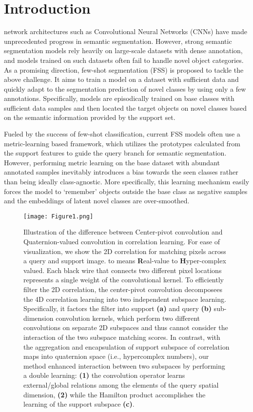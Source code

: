 \documentclass[lettersize,journal]{IEEEtran}
\begin{document}
\section{Introduction}\label{1.1}
 network architectures such as Convolutional Neural Networks (CNNs) have made unprecedented progress in semantic segmentation. However, strong semantic segmentation models\cite{RN2,RN3} rely heavily on large-scale datasets with dense annotation, and models trained on such datasets often fail to handle novel object categories. As a promising direction, few-shot segmentation (FSS) is proposed to tackle the above challenge. It aims to train a model on a dataset with sufficient data and quickly adapt to the segmentation prediction of novel classes by using only a few annotations. Specifically, models are episodically trained on base classes with sufficient data samples and then located the target objects on novel classes based on the semantic information provided by the support set.

Fueled by the success of few-shot classification\cite{RN33,RN34}, current  FSS  models\cite{RN21,RN24,RN9,RN8,RN22,RN6}  often  use  a  metric-learning based framework, which utilizes the prototypes calculated from the support features to guide the query branch for semantic segmentation. However, performing metric learning on the base dataset with abundant annotated samples inevitably introduces a bias towards the seen classes rather than being ideally class-agnostic. More specifically, this learning mechanism easily forces the model to ‘remember’ objects outside the base class as negative samples and the embeddings of latent novel classes are over-smoothed. 

\begin{figure}[t]
\centering
\texttt{[image: Figure1.png]}
\caption{Illustration of the difference between Center-pivot convolution\cite{RN38, RN85} and Quaternion-valued convolution in correlation learning. For ease of visualization, we show the 2D correlation for matching pixels across a query and support image.  to  means \textbf{R}eal-value to \textbf{H}yper-complex valued. Each black wire that connects two different pixel locations represents a single weight of the convolutional kernel. To efficiently filter the 2D correlation, the center-pivot convolution decomposees the 4D correlation learning into two independent subspace learning. Specifically, it factors the  filter into support \textbf{(a)} and query \textbf{(b)} sub-dimension convolution kernels, which perform two different convolutions on separate 2D subspaces and thus cannot consider the interaction of the two subspace matching scores. In contrast, with the aggregation and encapsulation of support subspace of correlation maps into quaternion space (i.e., hypercomplex numbers), our method enhanced interaction between two subspaces by performing a double learning: \textbf{(1)} the convolution operator learns external/global relations among the elements of the query spatial dimension, \textbf{(2)} while the Hamilton product accomplishes the learning of the support subspace \textbf{(c)}.
\label{Figure1}}
\end{figure}
\end{document}
